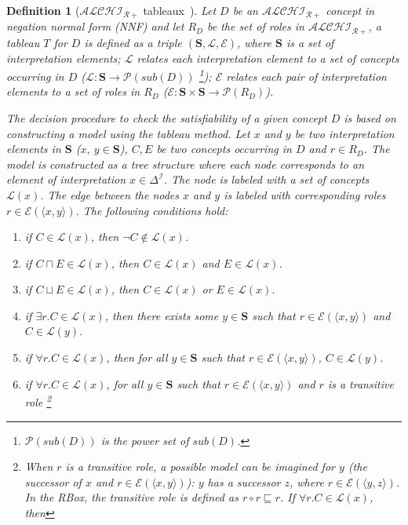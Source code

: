 \documentclass{article}
\newtheorem{mydef}{Definition}
\begin{document}
\begin{mydef}[$\mathcal{ALCHI_{R+}}$ tableaux~\cite{horrocks1999description}]
Let $D$ be an $\mathcal{ALCHI_{R+}}$ concept in negation normal form (NNF) and let $R_D$ be the set of roles in $\mathcal{ALCHI_{R+}}$, a tableau $T$ for $D$ is defined as a triple 
$(\mathbf{S},\mathcal{L}, \mathcal{E})$, where $\mathbf{S}$ is a set of interpretation elements; 
$\mathcal{L}$ relates each interpretation element to a set of concepts occurring in $D$ ($\mathcal{L}:\mathbf{S}\rightarrow\mathcal{P}(sub(D))$
\footnote{$\mathcal{P}(sub(D))$ is the power set of $sub(D)$.}); 
$\mathcal{E}$ relates each pair of interpretation elements to a set of roles in $R_D$  ($\mathcal{E}:\mathbf{S}\times\mathbf{S}\rightarrow \mathcal{P}(R_D)$). 

The decision procedure to check the satisfiability of a given concept $D$ is based on constructing a model using the tableau method. 
Let $x$ and $y$ be two interpretation elements in $\mathbf{S}$ ($x,~y\in \mathbf{S}$), $C,E$ be two concepts occurring in $D$ and $r\in R_D$.
The model is constructed as a tree structure where each node corresponds to an element of interpretation $x\in \Delta^\mathcal{I}$.
The node is labeled with a set of concepts $\mathcal{L}(x)$.
The edge between the nodes $x$ and $y$ is labeled with corresponding roles $r\in\mathcal{E}(\langle x,y \rangle)$.
The following conditions hold:
\begin{enumerate}
\item if $C\in \mathcal{L}(x)$, then $\neg C\notin\mathcal{L}(x)$.
\item if $C\sqcap E\in \mathcal{L}(x)$, then $ C\in\mathcal{L}(x)$ and $ E\in\mathcal{L}(x)$.
\item if $C\sqcup E\in \mathcal{L}(x)$, then $ C\in\mathcal{L}(x)$ or $ E\in\mathcal{L}(x)$.
\item if $\exists r.C\in \mathcal{L}(x)$, then there exists some $y\in \mathbf{S}$  such that $r \in \mathcal{E}(\langle x,y\rangle)$ and $C\in\mathcal{L}(y)$.
\item if $\forall r.C\in \mathcal{L}(x)$, then for all  $y \in \mathbf{S}$ such that $r \in \mathcal{E}(\langle x,y\rangle)$, $C\in\mathcal{L}(y)$.
\item if $\forall r.C\in \mathcal{L}(x)$, for all $y \in \mathbf{S}$ such that $r \in \mathcal{E}(\langle x,y\rangle)$ and $r$ is a transitive role
\footnote{When $r$ is a transitive role, a possible model can be imagined for $y$ (the successor of $x$ and $r\in\mathcal{E}(\langle x,y\rangle)$): 
$y$ has a successor $z$, where $r\in\mathcal{E}(\langle y,z\rangle)$. In the RBox, the transitive role is defined as $r\circ r\sqsubseteq r$. If $\forall r.C\in \mathcal{L}(x)$, then 
}
\end{enumerate}
\end{mydef}
\end{document}
